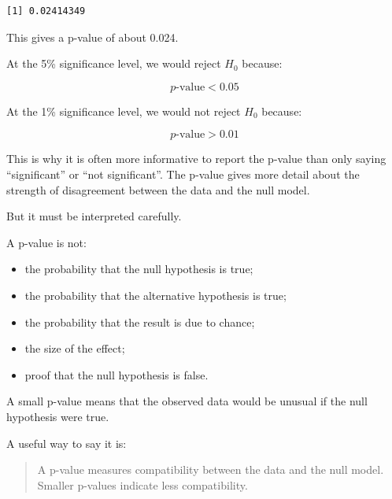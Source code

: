 \documentclass[
  letterpaper,
  DIV=11,
  numbers=noendperiod]{scrreprt}
\providecommand{\tightlist}{%
  \setlength{\itemsep}{0pt}\setlength{\parskip}{0pt}}
\begin{document}
\begin{verbatim}
[1] 0.02414349
\end{verbatim}

This gives a p-value of about 0.024.

At the 5\% significance level, we would reject \(H_0\) because:

\[
p\text{-value} < 0.05
\]

At the 1\% significance level, we would not reject \(H_0\) because:

\[
p\text{-value} > 0.01
\]

This is why it is often more informative to report the p-value than only
saying ``significant'' or ``not significant''. The p-value gives more
detail about the strength of disagreement between the data and the null
model.

But it must be interpreted carefully.

\begin{tcolorbox}[enhanced jigsaw, arc=.35mm, bottomrule=.15mm, bottomtitle=1mm, breakable, colback=white, colbacktitle=quarto-callout-important-color!10!white, colframe=quarto-callout-important-color-frame, coltitle=black, left=2mm, leftrule=.75mm, opacityback=0, opacitybacktitle=0.6, rightrule=.15mm, title=\textcolor{quarto-callout-important-color}{\faExclamation}\hspace{0.5em}{Warning: What a p-value is not}, titlerule=0mm, toprule=.15mm, toptitle=1mm]

A p-value is not:

\begin{itemize}
\tightlist
\item
  the probability that the null hypothesis is true;
\item
  the probability that the alternative hypothesis is true;
\item
  the probability that the result is due to chance;
\item
  the size of the effect;
\item
  proof that the null hypothesis is false.
\end{itemize}

A small p-value means that the observed data would be unusual if the
null hypothesis were true.

\end{tcolorbox}

A useful way to say it is:

\begin{quote}
A p-value measures compatibility between the data and the null model.
Smaller p-values indicate less compatibility.
\end{quote}
\end{document}
